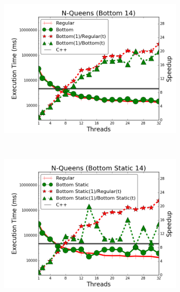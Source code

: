 \begin{figure}[]
        \begin{subfigure}[b]{\plotsize\textwidth}
           \includegraphics[width=\textwidth]{experiments/coordination/cmp-bottom-8queens-14.png}
           \mycap{}
           \label{fig:coordination:coord_14queensbottom}
        \end{subfigure} ~
        \begin{subfigure}[b]{\plotsize\textwidth}
           \includegraphics[width=\textwidth]{experiments/coordination/cmp-bottom-static-8queens-14.png}
           \mycap{}
           \label{fig:coordination:coord_14queensbottomstatic}
        \end{subfigure} \\
        \label{fig:coordination:results_queens-14}
\end{figure}

%
\clearpage
